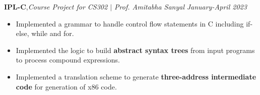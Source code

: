 \textbf{IPL-C}\sep{\it Course Project for CS302 $|$ Prof. Amitabha Sanyal} \hfill{\sl \small January-April 2023}\\
\vspace{-8pt}
\begin{itemize}[itemsep = -1.7 mm, leftmargin=*]
\item Implemented a grammar to handle control flow statements in C including if-else, while and for.
\item Implemented the logic to build \textbf{abstract syntax trees} from input programs to process compound expressions.
\item Implemented a translation scheme to generate \textbf{three-address intermediate code} for generation of x86 code.
\end{itemize}
